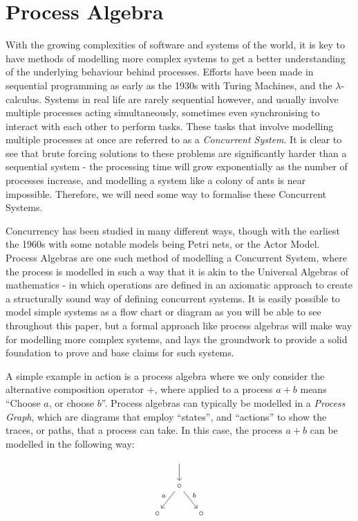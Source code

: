 \documentclass[logo,bsc,singlespacing,parskip,online]{infthesis}
\begin{document}
\section{Process Algebra}
With the growing complexities of software and systems of the world, it is key to have methods of modelling more complex systems to get a better understanding of the underlying behaviour behind processes. Efforts have been made in sequential programming as early as the 1930s with Turing Machines, and the $\lambda$-calculus. Systems in real life are rarely sequential however, and usually involve multiple processes acting simultaneously, sometimes even synchronising to interact with each other to perform tasks. These tasks that involve modelling multiple processes at once are referred to as a \textit{Concurrent System}. It is clear to see that brute forcing solutions to these problems are significantly harder than a sequential system - the processing time will grow exponentially as the number of processes increase, and modelling a system like a colony of ants is near impossible. Therefore, we will need some way to formalise these Concurrent Systems.

Concurrency has been studied in many different ways, though with the earliest  the 1960s with some notable models being Petri nets, or the Actor Model. Process Algebras are one such method of modelling a Concurrent System, where the process is modelled in such a way that it is akin to the Universal Algebras of mathematics - in which operations are defined in an axiomatic approach to create a structurally sound way of defining concurrent systems. \citep{baetenBriefHistoryProcess2005} It is easily possible to model simple systems as a flow chart or diagram as you will be able to see throughout this paper, but a formal approach like process algebras will make way for modelling more complex systems, and lays the groundwork to provide a solid foundation to prove and base claims for such systems.

A simple example in action is a process algebra where we only consider the alternative composition operator $+$, where applied to a process $a + b$ means ``Choose $a$, or choose $b$''. Process algebras can typically be modelled in a \textit{Process Graph}, which are diagrams that employ ``states'', and ``actions'' to show the traces, or paths, that a process can take. In this case, the process $a + b$ can be modelled in the following way:

\[\begin{tikzcd}[cramped,column sep=small]
	& {} \\
	& \circ \\
	\circ && \circ \\
	\arrow[from=1-2, to=2-2]
	\arrow["a"', from=2-2, to=3-1]
	\arrow["b", from=2-2, to=3-3]
\end{tikzcd}\]
\end{document}
